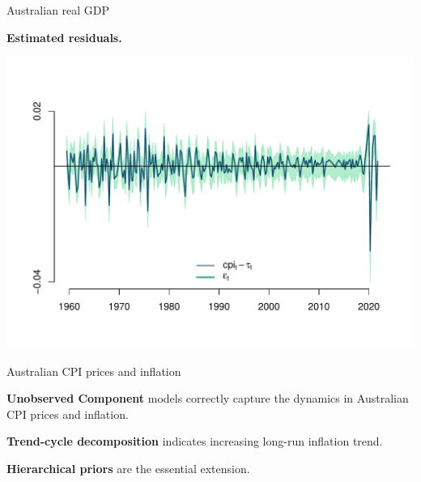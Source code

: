 \documentclass[notes,blackandwhite,mathsans,usenames,dvipsnames]{beamer}
\begin{document}
\begin{frame}{Australian real GDP}

\centering
\smallskip\textbf{Estimated residuals.}

\includegraphics[scale=0.65, trim=2cm 0.5cm 2cm 2cm]{results/gdp-uc-tvpdrift-epsilon.pdf}

\end{frame}















{
\begin{frame}{Australian CPI prices and inflation}

\bigskip\textbf{Unobserved Component} models correctly capture the dynamics in Australian CPI prices and inflation.

\bigskip\textbf{Trend-cycle decomposition} indicates increasing long-run inflation trend.

\bigskip\textbf{Hierarchical priors} are the essential extension.

\end{frame}
}
\end{document}
